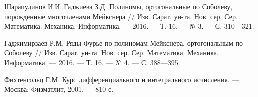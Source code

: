 \begin{thebibliography}{99}
Шарапудинов И.И.,Гаджиева  З.Д. Полиномы, ортогональные по Соболеву, порожденные многочленами Мейкснера // Изв. Сарат. ун-та. Нов. сер. Сер. Математика. Механика. Информатика. --- 2016. --- Т. 16. --- № 3. --- С. 310---321.






Гаджимирзаев Р.М. Ряды Фурье по полиномам Мейкснера, ортогональным по Соболеву // Изв. Сарат. ун-та. Нов. сер. Сер. Математика. Механика. Информатика. --- 2016. --- Т. 16. --- № 4. --- С. 388---395.






Фихтенгольц Г.М. Курс дифференциального и интегрального исчисления. --- Москва: Физматлит, 2001. --- 810 с.






\end{thebibliography}